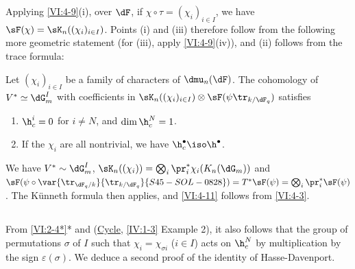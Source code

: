 Applying \ref{VI:4-9}(i), over $\dF$, if $\chi\circ \tau=(\chi_i)_{i\in I}$, 
we have $\sF(\chi) = \sK_n((\chi_i)_{i\in I})$. Points (i) and (iii) 
therefore follow from the following more geometric statement (for (iii), 
apply \ref{VI:4-9}(iv)), and (ii) follows from the trace formula: 





\begin{proposition_}\label{VI:4-11}
Let $(\chi_i)_{i\in I}$ be a family of characters of $\dmu_n(\dF)$. The 
cohomology of $V^\ast\simeq \dG_m^I$ with coefficients in 
$\sK_n((\chi_i)_{i\in I})\otimes \sF(\psi\tr_{k/\dF_q})$ satisfies 
\begin{enumerate}[\indent (i)]
  \item $\h_c^i{}=0$ for $i\ne N$, and $\dim \h_c^N{} = 1$. 
  \item If the $\chi_i$ are all nontrivial, we have 
    $\h_c^\bullet{}\iso \h^\bullet$. 
\end{enumerate}
\end{proposition_}

We have $V^\ast\sim \dG_m^I$, 
$\sK_n((\chi_i)) = \bigotimes_i \pr_i^\ast \chi_i(K_n(\dG_m))$ and 
$\sF(\psi\circ \var{\tr_{\dF_q/k}}{\tr_{k/\dF_q}}{S45-SOL-0828})=T^\ast \sF(\psi) = \bigotimes_i \pr_i^\ast \sF(\psi)$. 
The K\"unneth formula then applies, and \ref{VI:4-11} follows from 
\ref{VI:4-3}. 





\subsection{}\label{VI:4-12}

From \ref{VI:2-4*}* and (\hyperref[IV]{Cycle}, \ref{IV:1-3} Example 2), it also follows 
that the group of permutations $\sigma$ of $I$ such that 
$\chi_i = \chi_{\sigma i}$ ($i\in I$) acts on $\h_c^N$ by multiplication by 
the sign $\varepsilon(\sigma)$. We deduce a second proof 
of the identity of Hasse-Davenport. 

